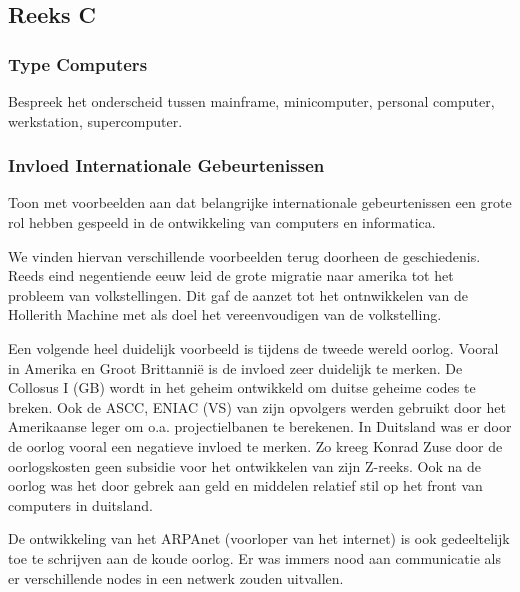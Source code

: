 \documentclass[../main.tex]{subfiles}
\begin{document}
\subsection{Reeks C}
\subsubsection{Type Computers}
\begin{question}
Bespreek het onderscheid tussen mainframe, minicomputer, personal computer, werkstation, supercomputer.
\end{question}
\begin{solution}
\end{solution}

\subsubsection{Invloed Internationale Gebeurtenissen}
\begin{question}
Toon met voorbeelden aan dat belangrijke internationale gebeurtenissen een grote rol hebben gespeeld in de ontwikkeling van computers en informatica.
\end{question}
\begin{solution}
		We vinden hiervan verschillende voorbeelden terug doorheen de geschiedenis.
		Reeds eind negentiende eeuw leid de grote migratie naar amerika tot het probleem van volkstellingen.
		Dit gaf de aanzet tot het ontnwikkelen van de Hollerith Machine met als doel het vereenvoudigen van de volkstelling.

		Een volgende heel duidelijk voorbeeld is tijdens de tweede wereld oorlog.
		Vooral in Amerika en Groot Brittanni\"e is de invloed zeer duidelijk te merken. 
		De Collosus I (GB) wordt in het geheim ontwikkeld om duitse geheime codes te breken. 
		Ook de ASCC, ENIAC (VS) van zijn opvolgers werden gebruikt door het Amerikaanse leger om o.a. projectielbanen te berekenen. 
		In Duitsland was er door de oorlog vooral een negatieve invloed te merken.
		Zo kreeg Konrad Zuse door de oorlogskosten geen subsidie voor het ontwikkelen van zijn Z-reeks.
		Ook na de oorlog was het door gebrek aan geld en middelen relatief stil op het front van computers in duitsland.	

		De ontwikkeling van het ARPAnet (voorloper van het internet) is ook gedeeltelijk toe te schrijven aan de koude oorlog. 
		Er was immers nood aan communicatie als er verschillende nodes in een netwerk zouden uitvallen.
\end{solution}
\end{document}
